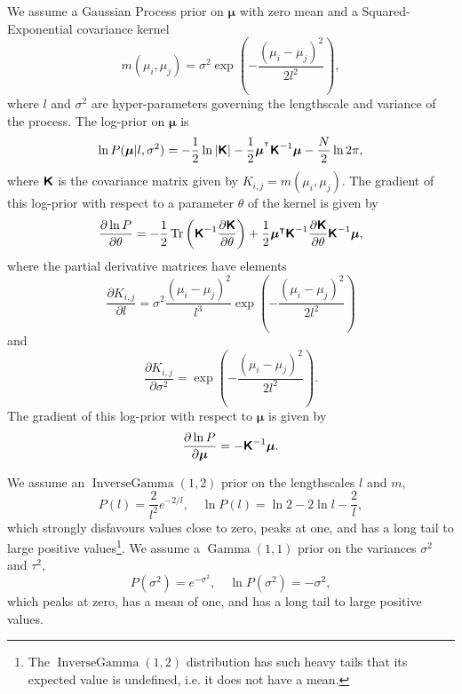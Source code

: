 \documentclass[fleqn,usenatbib]{mnras}
\begin{document}
We assume a Gaussian Process prior on $\boldsymbol{\mu}$ with zero mean and a Squared-Exponential covariance kernel
\begin{equation}
    m(\mu_i,\mu_j) = \sigma^2 \exp\left({-\frac{(\mu_i-\mu_j)^2}{2l^2}}\right),
\end{equation}
where $l$ and $\sigma^2$ are hyper-parameters governing the lengthscale and variance of the process. The log-prior on $\boldsymbol{\mu}$ is
\begin{equation}
    \ln{P(\boldsymbol{\mu}|l,\sigma^2)} = -\frac{1}{2}\ln|\textbf{\textsf{K}}|-\frac{1}{2}\boldsymbol{\mu}^{^\intercal}\textbf{\textsf{K}}^{-1}\boldsymbol{\mu} -\frac{N}{2}\ln2\pi,
\end{equation}
where $\textbf{\textsf{K}}$ is the covariance matrix given by $K_{i,j}=m(\mu_i,\mu_j)$. The gradient of this log-prior with respect to a parameter $\theta$ of the kernel is given by
\begin{equation}
    \frac{\partial\ln P}{\partial \theta} = -\frac{1}{2}\operatorname{Tr}\left(\textbf{\textsf{K}}^{-1}\frac{\partial\textbf{\textsf{K}}}{\partial \theta}\right) + \frac{1}{2}\boldsymbol{\mu}^\intercal\textbf{\textsf{K}}^{-1}\frac{\partial\textbf{\textsf{K}}}{\partial \theta}\textbf{\textsf{K}}^{-1}\boldsymbol{\mu},
\end{equation}
where the partial derivative matrices have elements
\begin{equation}
    \frac{\partial K_{i,j}}{\partial l} = \sigma^2\frac{(\mu_i-\mu_j)^2}{l^3}\exp\left({-\frac{(\mu_i-\mu_j)^2}{2l^2}}\right)
\end{equation}
and
\begin{equation}
    \frac{\partial K_{i,j}}{\partial \sigma^2} = \exp\left({-\frac{(\mu_i-\mu_j)^2}{2l^2}}\right).
\end{equation}
The gradient of this log-prior with respect to $\boldsymbol{\mu}$ is given by
\begin{equation}
    \frac{\partial \ln P}{\partial \boldsymbol{\mu}} = -\textbf{\textsf{K}}^{-1}\boldsymbol{\mu}.
\end{equation}

We assume an $\operatorname{InverseGamma}(1,2)$ prior on the lengthscales $l$ and $m$,
\begin{equation}
    P(l) = \frac{2}{l^2}e^{-2/l},\quad \ln{P(l)} = \ln{2}-2\ln{l}-\frac{2}{l},
\end{equation}
which strongly disfavours values close to zero, peaks at one, and has a long tail to large positive values\footnote{The $\operatorname{InverseGamma}(1,2)$ distribution has such heavy tails that its expected value is undefined, i.e. it does not have a mean.}. We assume a $\operatorname{Gamma}(1,1)$ prior on the variances $\sigma^2$ and $\tau^2$,
\begin{equation}
    P(\sigma^2) = e^{-\sigma^2},\quad \ln{P(\sigma^2)} = -\sigma^2,
\end{equation}
which peaks at zero, has a mean of one, and has a long tail to large positive values.
\end{document}
